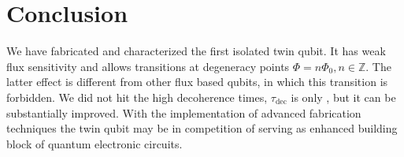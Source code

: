 \section{Conclusion}
\noindent We have fabricated and characterized the first isolated twin qubit. It has weak flux
sensitivity   and   allows   \ilra   {}   transitions   at   degeneracy   points
$ \Phi =  n\Phi_0, n\in\mathbb{Z} $. The latter  effect is different from other flux  based qubits, in
which  this   transition  is  forbidden.   We   did  not  hit  the   high  decoherence  times,
$\tau_{\text{dec}}$  is only  , but  it can  be substantially  improved.  With  the
implementation of  advanced fabrication  techniques the  twin qubit may  be in  competition of
serving as enhanced building block of quantum electronic circuits.


\noindent
